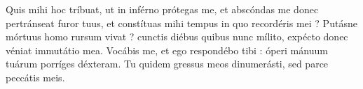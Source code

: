 
Quis mihi hoc tríbuat, ut in inférno prótegas me, et abscóndas me donec pertránseat furor tuus, et constítuas mihi tempus in quo recordéris mei ?
Putásne mórtuus homo rursum vivat ? cunctis diébus quibus nunc mílito, expécto donec véniat immutátio mea.
Vocábis me, et ego respondébo tibi : óperi mánuum tuárum porríges déxteram.
Tu quidem gressus meos dinumerásti, sed parce peccátis meis.